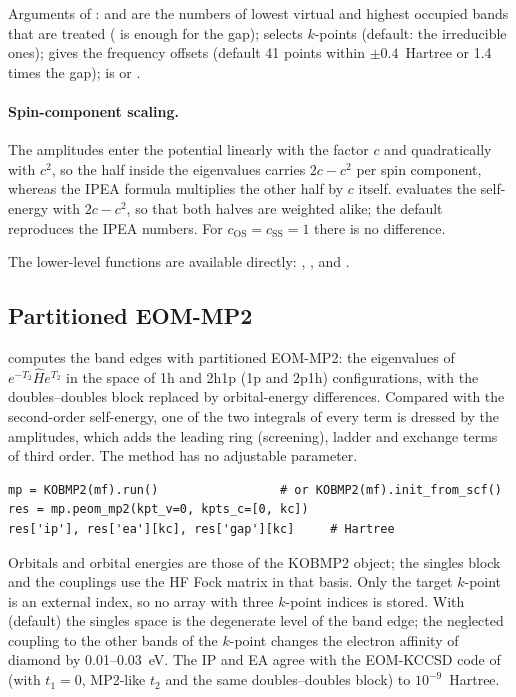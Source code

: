 Arguments of :  and  are the numbers
of lowest virtual and highest occupied bands that are treated
( is enough for the gap);  selects
$k$-points (default: the irreducible ones);  gives the frequency
offsets (default 41 points within $\pm0.4$~Hartree or 1.4 times the gap);
 is  or .

\paragraph{Spin-component scaling.} The amplitudes enter the potential
linearly with the factor $c$ and quadratically with $c^2$, so the half inside
the eigenvalues carries $2c-c^2$ per spin component, whereas the IPEA formula
multiplies the other half by $c$ itself. 
evaluates the self-energy with $2c-c^2$, so that both halves are weighted
alike; the default  reproduces the IPEA numbers. For
$c_{\mathrm{OS}}=c_{\mathrm{SS}}=1$ there is no difference.

The lower-level functions are available directly:
, ,  and .

\subsection{Partitioned EOM-MP2}

 computes the band edges with partitioned EOM-MP2: the
eigenvalues of $e^{-T_2}\hat He^{T_2}$ in the space of 1h and 2h1p (1p and
2p1h) configurations, with the doubles--doubles block replaced by
orbital-energy differences. Compared with the second-order self-energy, one of
the two integrals of every term is dressed by the amplitudes, which adds the
leading ring (screening), ladder and exchange terms of third order. The method
has no adjustable parameter.

\begin{lstlisting}[style=python]
mp = KOBMP2(mf).run()                 # or KOBMP2(mf).init_from_scf()
res = mp.peom_mp2(kpt_v=0, kpts_c=[0, kc])
res['ip'], res['ea'][kc], res['gap'][kc]     # Hartree
\end{lstlisting}

Orbitals and orbital energies are those of the KOBMP2 object; the singles
block and the couplings use the HF Fock matrix in that basis. Only the target
$k$-point is an external index, so no array with three $k$-point indices is
stored. With  (default) the singles space is the
degenerate level of the band edge; the neglected coupling to the other bands
of the $k$-point changes the electron affinity of diamond by 0.01--0.03~eV.
The IP and EA agree with the EOM-KCCSD code of \pyscf{} (with $t_1=0$,
MP2-like $t_2$ and the same doubles--doubles block) to $10^{-9}$~Hartree.

